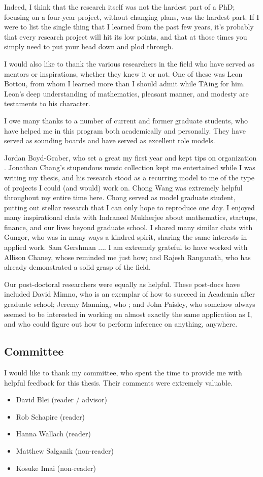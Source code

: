 Indeed, I think that the research itself was not the hardest part of a
PhD; focusing on a four-year project, without changing plans, was the
hardest part. If I were to list the single thing that I learned from
the past few years, it's probably that every research project will hit
its low points, and that at those times you simply need to put your
head down and plod through.

I would also like to thank the various researchers in the field who
have served as mentors or inspirations, whether they knew it or not.
One of these was Leon Bottou, from whom I learned more than I should
admit while TAing for him. Leon's deep understanding of mathematics,
pleasant manner, and modesty are testaments to his character.

I owe many thanks to a number of current and former graduate students,
who have helped me in this program both academically and personally.
They have served as sounding boards and have served as excellent role
models.

Jordan Boyd-Graber, who set a great my first year and kept tips on
organization .  Jonathan Chang's stupendous music collection kept me
entertained while I was writing my thesis, and his research stood as a
recurring model to me of the type of projects I could (and would) work
on. Chong Wang was extremely helpful throughout my entire time
here. Chong served as model graduate student, putting out stellar
research that I can only hope to reproduce one day.  I enjoyed many
inspirational chats with Indraneel Mukherjee about mathematics,
startups, finance, and our lives beyond graduate school.  I shared
many similar chats with Gungor, who was in many ways a kindred spirit,
sharing the same interests in applied work.  Sam Gershman ....  I am
extremely grateful to have worked with Allison Chaney, whose reminded
me just how; and Rajesh Ranganath, who has already demonstrated a
solid grasp of the field.

Our post-doctoral researchers were equally as helpful.  These
post-docs have included David Mimno, who is an exemplar of how to
succeed in Academia after graduate school; Jeremy Manning, who ; and
John Paisley, who somehow always seemed to be interested in working on
almost exactly the same application as I, and who could figure out how
to perform inference on anything, anywhere.

\subsection*{Committee}
I would like to thank my committee, who spent the time to provide me
with helpful feedback for this thesis.  Their comments were extremely valuable.
\begin{itemize}
  \item David Blei (reader / advisor)
  \item Rob Schapire (reader)
  \item Hanna Wallach (reader)
  \item Matthew Salganik (non-reader)
  \item Kosuke Imai (non-reader)
\end{itemize}


